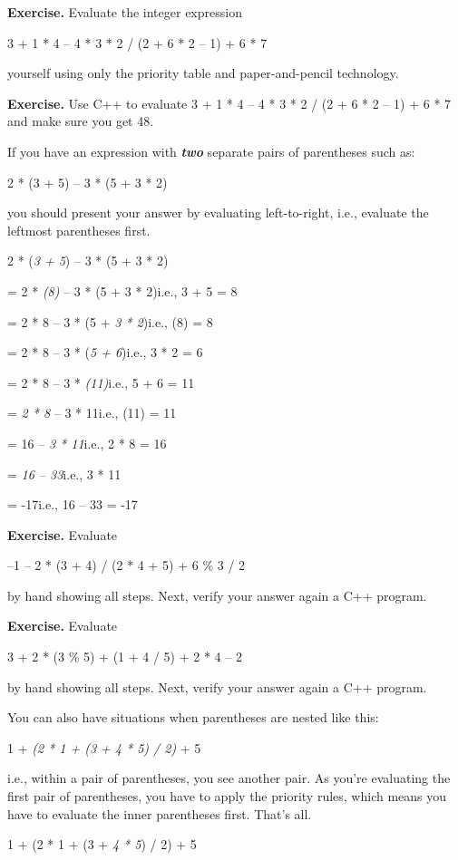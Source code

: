 \documentclass[
]{article}
\begin{document}
\textbf{Exercise.} Evaluate the integer expression

3 + 1 * 4 -- 4 * 3 * 2 / (2 + 6 * 2 -- 1) + 6 * 7

yourself using only the priority table and paper-and-pencil technology.

\textbf{Exercise.} Use C++ to evaluate 3 + 1 * 4 -- 4 * 3 * 2 / (2 + 6 *
2 -- 1) + 6 * 7 and make sure you get 48.

If you have an expression with \emph{\textbf{two}} separate pairs of
parentheses such as:

2 * (3 + 5) -- 3 * (5 + 3 * 2)

you should present your answer by evaluating left-to-right, i.e.,
evaluate the leftmost parentheses first.

2 * (\emph{3 + 5}) -- 3 * (5 + 3 * 2)

= 2 * \emph{(8)} -- 3 * (5 + 3 * 2)i.e., 3 + 5 = 8

= 2 * 8 -- 3 * (5 + \emph{3 * 2})i.e., (8) = 8

= 2 * 8 -- 3 * (\emph{5 + 6})i.e., 3 * 2 = 6

= 2 * 8 -- 3 * \emph{(11)}i.e., 5 + 6 = 11

= \emph{2 * 8} -- 3 * 11i.e., (11) = 11

= 16 -- \emph{3 * 11}i.e., 2 * 8 = 16

= \emph{16 -- 33}i.e., 3 * 11

= -17i.e., 16 -- 33 = -17

\textbf{Exercise.} Evaluate

--1 -- 2 * (3 + 4) / (2 * 4 + 5) + 6 \% 3 / 2

by hand showing all steps. Next, verify your answer again a C++ program.

\textbf{Exercise.} Evaluate

3 + 2 * (3 \% 5) + (1 + 4 / 5) + 2 * 4 -- 2

by hand showing all steps. Next, verify your answer again a C++ program.

You can also have situations when parentheses are nested like this:

1 + \emph{(2 * 1 + (3 + 4 * 5) / 2)} + 5

i.e., within a pair of parentheses, you see another pair. As you're
evaluating the first pair of parentheses, you have to apply the priority
rules, which means you have to evaluate the inner parentheses first.
That's all.

1 + (2 * 1 + (3 + \emph{4 * 5}) / 2) + 5
\end{document}
